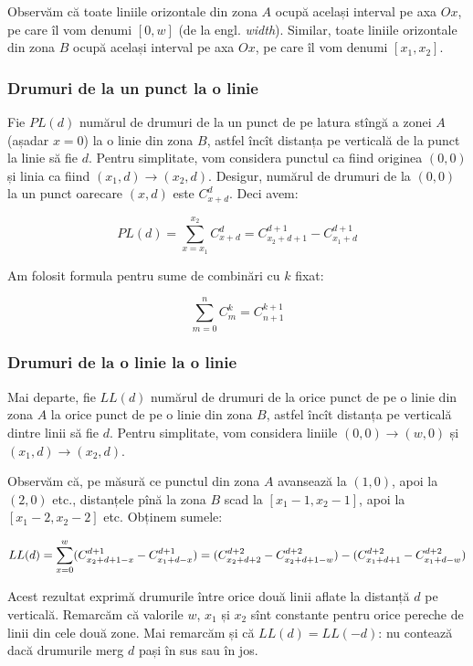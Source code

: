 \documentclass[../main.tex]{subfiles}
\begin{document}
Observăm că toate liniile orizontale din zona $A$ ocupă același interval pe axa $Ox$, pe care îl vom denumi $[0, w]$ (de la engl. \textit{width}). Similar, toate liniile orizontale din zona $B$ ocupă același interval pe axa $Ox$, pe care îl vom denumi $[x_1, x_2]$.

\subsubsection*{Drumuri de la un punct la o linie}

Fie $PL(d)$ numărul de drumuri de la un punct de pe latura stîngă a zonei $A$ (așadar $x=0$) la o linie din zona $B$, astfel încît distanța pe verticală de la punct la linie să fie $d$. Pentru simplitate, vom considera punctul ca fiind originea $(0,0)$ și linia ca fiind $(x_1, d) \to (x_2, d)$. Desigur, numărul de drumuri de la $(0,0)$ la un punct oarecare $(x, d)$ este $C_{x + d}^d$. Deci avem:

$$PL(d) = \sum_{x=x_1}^{x_2} C_{x+d}^{d} = C_{x_2 + d + 1}^{d + 1} - C_{x_1 + d}^{d + 1}$$

Am folosit formula pentru sume de combinări cu $k$ fixat:

$$\sum_{m = 0}^n C_m^k = C_{n + 1}^{k + 1}$$

\subsubsection*{Drumuri de la o linie la o linie}

Mai departe, fie $LL(d)$ numărul de drumuri de la orice punct de pe o linie din zona $A$ la orice punct de pe o linie din zona $B$, astfel încît distanța pe verticală dintre linii să fie $d$. Pentru simplitate, vom considera liniile $(0,0) \to (w, 0)$ și $(x_1, d) \to (x_2, d)$.

Observăm că, pe măsură ce punctul din zona $A$ avansează la $(1,0)$, apoi la $(2,0)$ etc., distanțele pînă la zona $B$ scad la $[x_1 - 1, x_2 - 1]$, apoi la $[x_1 - 2, x_2 - 2]$ etc. Obținem sumele:

$$
LL(d) = \sum_{x = 0}^{w} (C_{x_2 + d + 1 - x}^{d + 1} - C_{x_1 + d - x}^{d + 1})\\
= (C_{x_2 + d + 2}^{d + 2} - C_{x_2 + d + 1 - w}^{d + 2}) - (C_{x_1 + d + 1}^{d + 2} - C_{x_1 + d - w}^{d + 2})
$$

Acest rezultat exprimă drumurile între orice două linii aflate la distanță $d$ pe verticală. Remarcăm că valorile $w$, $x_1$ și $x_2$ sînt constante pentru orice pereche de linii din cele două zone. Mai remarcăm și că $LL(d) = LL(-d)$: nu contează dacă drumurile merg $d$ pași în sus sau în jos.
\end{document}
